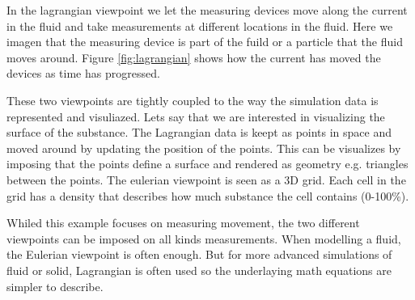 In the lagrangian viewpoint we let the measuring devices move along
the current in the fluid and take measurements at different locations
in the fluid. Here we imagen that the measuring device is part of the
fuild or a particle that the fluid moves around. Figure
\ref{fig:lagrangian} shows how the current has moved the devices as
time has progressed.

These two viewpoints are tightly coupled to the way the simulation data
is represented and visuliazed. Lets say that we are interested in
visualizing the surface of the substance.
%
The Lagrangian data is keept as points in space and moved around by
updating the position of the points. This can be visualizes by
imposing that the points define a surface and rendered as geometry
e.g. triangles between the points.
%
The eulerian viewpoint is seen as a 3D grid. Each cell in the grid has
a density that describes how much substance the cell contains (0-100\%).

Whiled this example focuses on measuring movement, the two different
viewpoints can be imposed on all kinds measurements.
%
When modelling a fluid, the Eulerian viewpoint is often
enough. But for more advanced simulations of fluid or solid,
Lagrangian is often used so the underlaying math equations are simpler
to describe.






